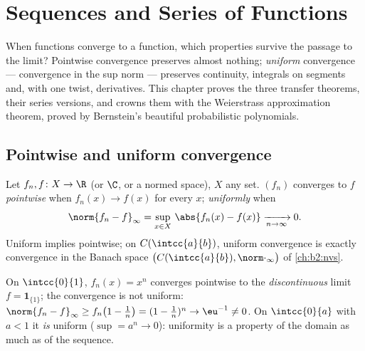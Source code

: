 \chapter{Sequences and Series of Functions}\label{ch:b2:funcseq}

When functions converge to a function, which properties survive the
passage to the limit? Pointwise convergence preserves almost
nothing; \emph{uniform} convergence --- convergence in the sup norm
--- preserves continuity, integrals on segments and, with one twist,
derivatives. This chapter proves the three transfer theorems,
their series versions, and crowns them with the Weierstrass
approximation theorem, proved by Bernstein's beautiful probabilistic
polynomials.

\section{Pointwise and uniform convergence}

\begin{definition}\label{def:b2:funcseq:def}
Let $f_n, f \colon X \to \R$ (or $\C$, or a normed space), $X$ any
set. $(f_n)$ converges to $f$
\emph{pointwise} when $f_n(x) \to
f(x)$ for every $x$; \emph{uniformly}
when
\[
\norm{f_n - f}_\infty = \sup_{x \in X}\, \abs{f_n(x) - f(x)}
\xrightarrow[n \to \infty]{} 0 .
\]
Uniform implies pointwise; on $C(\intcc{a}{b})$, uniform convergence
is exactly convergence in the Banach space
$\bigl(C(\intcc{a}{b}), \norm\cdot_\infty\bigr)$ of
\cref{ch:b2:nvs}.
\end{definition}

\begin{example}\label{ex:b2:funcseq:xn}
On $\intcc{0}{1}$, $f_n(x) = x^n$ converges pointwise to the
\emph{discontinuous} limit $f = \mathbf{1}_{\{1\}}$; the convergence
is not uniform: $\norm{f_n - f}_\infty \geq f_n\bigl(1 -
\tfrac1n\bigr) = (1 - \tfrac1n)^n \to \eu^{-1} \neq 0$. On
$\intcc{0}{a}$ with $a < 1$ it \emph{is} uniform ($\sup = a^n \to
0$): uniformity is a property of the domain as much as of the
sequence.
\end{example}

